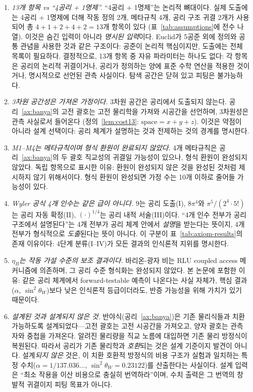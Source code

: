 \documentclass[entropy,article,submit,pdftex,oneauthor]{Definitions/mdpi}
\begin{document}
\begin{enumerate}
\item \emph{13개 항목 vs ``4공리 + 1명제''.} ``4공리 + 1명제''는 논리적 뼈대이다. 실제 도출에는 4공리 + 1명제에 더해 작동 정의 2개, 메타규칙 4개, 공리 구조 귀결 2개가 사용되어 총 $4{+}1{+}2{+}4{+}2 = 13$개 항목이 있다 (표~\ref{tab:assumptions}에 전수 나열). 이것은 숨긴 입력이 아니라 \emph{명시된 입력}이다. Euclid가 5공준 외에 정의와 공통 관념을 사용한 것과 같은 구조이다: 공준이 논리적 핵심이지만, 도출에는 전체 목록이 필요하다. 결정적으로, 13개 항목 중 자유 파라미터는 하나도 없다: 각 항목은 공리의 논리적 귀결이거나, 공리가 정의하는 양에 표준 수학 연산을 적용한 것이거나, 명시적으로 선언된 관측 사실이다. 탐색 공간은 닫혀 있고 피팅은 불가능하다.

\item \emph{3차원 공간성은 가져온 가정이다.} 3차원 공간은 공리에서 도출되지 않는다. 공리~\ref{ax:banya}의 고전 괄호는 고전 물리학을 가져와 시공간을 선언하며, 3차원성은 관측 사실로서 들어온다 (정의~\ref{lem:cost13}: $\mathrm{space} = x+y+z$). 이것은 약점이 아니라 설계 선택이다: 공리 체계가 설명하는 것과 전제하는 것의 경계를 명시한다.

\item \emph{M1--M4는 메타규칙이며 형식 환원이 완료되지 않았다.} 4개 메타규칙은 공리~\ref{ax:banya}의 두 괄호 직교성의 귀결일 가능성이 있으나, 형식 환원이 완성되지 않았다. 독립 항목으로 표시한 이유: 환원이 완성되지 않은 것을 완성된 것처럼 제시하지 않기 위해서이다. 형식 환원이 완성되면 가정 수는 10개 이하로 줄어들 가능성이 있다.

\item \emph{Wyler 공식 4개 인수는 같은 급이 아니다.} $9$는 공리 도출(I), $8\pi^4$와 $\pi^5/(2^4 \cdot 5!)$는 공리 자동 확정(II), $(\cdot)^{1/4}$는 공리 내적 서술(III)이다. ``4개 인수 전부가 공리 구조에서 설명된다''는 4개 전부가 공리 체계 안에서 \emph{설명}을 받는다는 뜻이지, 4개 전부가 형식적으로 \emph{도출}된다는 뜻이 아니다. 이 구분이 표~\ref{tab:axiom-results}의 존재 이유이다: 4단계 분류(I--IV)가 모든 결과의 인식론적 지위를 명시한다.

\item \emph{$\eta_B$는 작동 가설 수준의 보조 결과이다.} 바리온-광자 비는 RLU coupled access 메커니즘에 의존하며, 그 공리 수준 형식화는 완성되지 않았다. 본 논문에 포함한 이유: 같은 공리 체계에서 forward-testable 예측이 나온다는 사실 자체가, 핵심 결과($\alpha$, $\sin^2\theta_W$)보다 낮은 인식론적 등급이더라도, 반증 가능성을 위해 가치가 있기 때문이다.

\item \emph{설계된 것과 설계되지 않은 것.} 반야식(공리~\ref{ax:banya})은 기존 물리식들과 치환 가능하도록 설계되었다---고전 괄호는 고전 시공간을 가져오고, 양자 괄호는 관측자와 중첩을 가져온다. 알려진 물리량을 직교 노름에 대입하면 기존 물리 방정식이 복원된다. 따라서 공리가 기존 물리학과 \emph{호환}되는 것은 설계 기준이지 발견이 아니다. 설계\emph{되지 않은} 것은, 이 치환 호환적 방정식의 비용 구조가 실험과 일치하는 특정 수치($\alpha = 1/137.036\ldots$, $\sin^2\theta_W = 0.23122$)를 산출한다는 사실이다. 설계 입력은 ``최소 작용을 이산 비용으로 충실히 번역하라''이며, 수치 출력은 그 번역의 창발적 귀결이지 피팅 목표가 아니다.
\end{enumerate}
\end{document}
